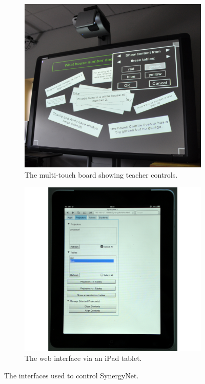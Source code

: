 \documentclass[manuscript, review, screen]{acmart}
\begin{document}
\begin{figure}[h]
	\centering
	\begin{subfigure}[h]{0.23\textwidth}
		\centering
		\includegraphics[width=\textwidth]{figures/control_board.png}
		\caption{The multi-touch board showing teacher controls.}
		\label{fig:controlBoard}
	\end{subfigure}
	\begin{subfigure}[h]{0.23\textwidth}
		\centering
		\includegraphics[width=\textwidth]{figures/control_tablet.png}
		\caption{The web interface via an iPad tablet.}
		\label{fig:controlTablet}
	\end{subfigure}
   	\caption{The interfaces used to control SynergyNet.}
   	\label{fig:controlDevices}
\end{figure} 
\end{document}
